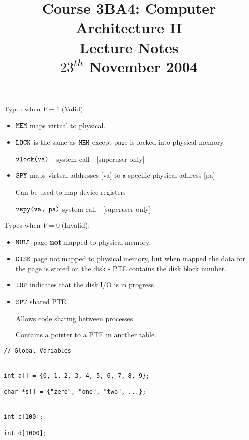 \documentclass[a4paper,12pt]{article}
\begin{document}
\title{Course 3BA4: Computer Architecture II \\ Lecture Notes \\ $23^{th}$ November 2004}

\maketitle

Types when $V = 1$ (Valid):

\begin{itemize}

\item $\verb!MEM!$ maps virtual to physical.

\item $\verb!LOCK!$ is the same as $\verb!MEM!$ except page is locked
into physical memory.

\subitem $\verb!vlock(va)!$ - system call - [superuser only]

\item $\verb!SPY!$ maps virtual addresses [va] to a specific physical
address [pa]

\subitem Can be used to map device registers

\subitem $\verb!vspy(va, pa)!$ system call - [superuser only]

\end{itemize}


Types when $V = 0$ (Invalid):

\begin{itemize}

\item $\verb!NULL!$ page \textbf{not} mapped to physical memory.

\item $\verb!DISK!$ page not mapped to physical memory, but when mapped
the data for the page is stored on the disk - PTE contains the disk
block number.

\item $\verb!IOP!$ indicates that the disk I/O is in progress

\item $\verb!SPT!$ shared PTE

\subitem Allows code sharing between processes

\subitem Contains a pointer to a PTE in another table.

\end{itemize}

\begin{verbatim}
// Global Variables


int a[] = {0, 1, 2, 3, 4, 5, 6, 7, 8, 9};

char *s[] = {"zero", "one", "two", ...};


int c[100];

int d[1000];
\end{verbatim}
\end{document}

